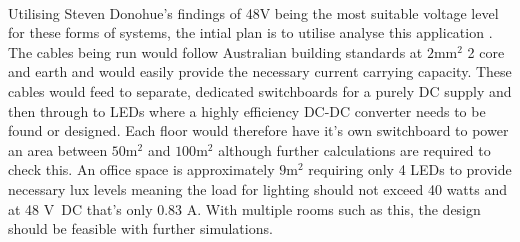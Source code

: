 \paragraph{}
Utilising Steven Donohue's findings of 48V being the most suitable voltage level for these forms  of systems, the intial plan is to utilise analyse this application \cite{Donohue2014}. The cables being run would follow Australian building standards at $2\text{mm}^{2}$ 2 core and earth and would easily provide the necessary current carrying capacity. These cables would feed to separate, dedicated switchboards for a purely DC supply and then through to LEDs where a highly efficiency DC-DC converter needs to be found or designed. Each floor would therefore have it's own switchboard to power an area between $50\text{m}^{2}$ and $100\text{m}^{2}$ although further calculations are required to check this. An office space is approximately $9\text{m}^{2}$ requiring only 4 LEDs to provide necessary lux levels meaning the load for lighting should not exceed 40 watts and at 48 \si{V DC} that's only 0.83 \si{A}. With multiple rooms such as this, the design should be feasible with further simulations.  

\newpage